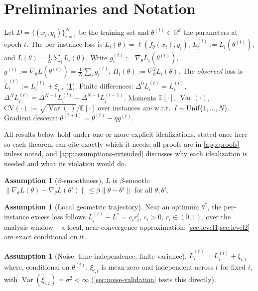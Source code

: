 \documentclass{article}
\theoremstyle{plain}
\theoremstyle{definition}
\newtheorem{assumption}[theorem]{Assumption}
\theoremstyle{remark}
\DeclareMathOperator{\Var}{Var}
\newcommand{\CV}{\mathrm{CV}}
\newcommand{\R}{\mathbb{R}}
\begin{document}
\section{Preliminaries and Notation}
\label{sec:prelim}

Let $D = \{(x_i,y_i)\}_{i=1}^N$ be the training set and $\theta^{(t)} \in \R^d$ the parameters at epoch $t$. The per-instance loss is $L_i(\theta) = \ell(f_\theta(x_i),y_i)$, $L_i^{(t)} := L_i(\theta^{(t)})$, and $L(\theta) = \frac1N\sum_i L_i(\theta)$. Write $g_i^{(t)} := \nabla_\theta L_i(\theta^{(t)})$, $g^{(t)} := \nabla_\theta L(\theta^{(t)}) = \frac1N\sum_i g_i^{(t)}$, $H_i(\theta) := \nabla_\theta^2 L_i(\theta)$. The \emph{observed} loss is $\tilde L_i^{(t)} := L_i^{(t)} + \xi_{i,t}$ (\cref{ass:noise}). Finite differences: $\Delta^0 L_i^{(t)} = L_i^{(t)}$, $\Delta^N L_i^{(t)} = \Delta^{N-1}L_i^{(t)} - \Delta^{N-1}L_i^{(t-1)}$. Moments $\mathbb E[\cdot]$, $\Var(\cdot)$, $\CV(\cdot) := \sqrt{\Var(\cdot)}/\mathbb E[\cdot]$ over instances are w.r.t.\ $I \sim \mathrm{Unif}\{1,\dots,N\}$. Gradient descent: $\theta^{(t+1)} = \theta^{(t)} - \eta g^{(t)}$.

All results below hold under one or more explicit idealizations, stated once here so each theorem can cite exactly which it needs; all proofs are in \cref{app:proofs} unless noted, and \cref{app:assumptions-extended} discusses why each idealization is needed and what its violation would do.

\begin{assumption}[$\beta$-smoothness]
\label{ass:smooth}
$L$ is $\beta$-smooth: $\|\nabla_\theta L(\theta) - \nabla_\theta L(\theta')\| \le \beta\|\theta-\theta'\|$ for all $\theta,\theta'$.
\end{assumption}

\begin{assumption}[Local geometric trajectory]
\label{ass:geometric}
Near an optimum $\theta^*$, the per-instance excess loss follows $L_i^{(t)} - L^* = c_i r_i^t$, $c_i>0$, $r_i \in (0,1)$, over the analysis window -- a local, near-convergence approximation; \cref{sec:level1,sec:level2} are exact conditional on it.
\end{assumption}

\begin{assumption}[Noise: time-independence, finite variance]
\label{ass:noise}
$\tilde L_i^{(t)} = L_i^{(t)} + \xi_{i,t}$ where, conditional on $\theta^{(t)}$, $\xi_{i,t}$ is mean-zero and independent across $t$ for fixed $i$, with $\Var(\xi_{i,t}) = \sigma^2 < \infty$ (\cref{sec:noise-validation} tests this directly).
\end{assumption}
\end{document}
